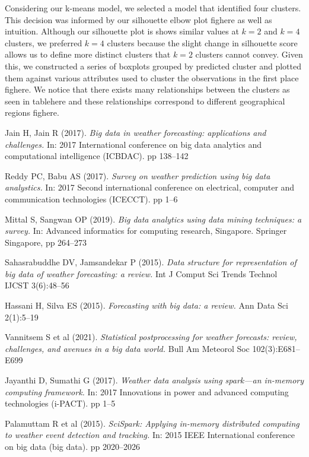 \documentclass[conference]{IEEEtran}
\begin{document}
Considering our k-means model, we selected a model that identified four clusters. This decision was informed by our silhouette elbow plot fighere as well as intuition. Although our silhouette plot is shows similar values at $k = 2$ and $k =4$ clusters, we preferred $k = 4$ clusters because the slight change in silhouette score allows us to define more distinct clusters that $k  = 2$ clusters cannot convey. Given this, we constructed a series of boxplots grouped by predicted cluster and plotted them against various attributes used to cluster the observations in the first place fighere. We notice that there exists many relationships between the clusters as seen in tablehere and these relationships correspond to different geographical regions fighere.

\begin{thebibliography}{9}

Jain H, Jain R (2017). \textit{Big data in weather forecasting: applications and challenges.} In: 2017 International conference on big data analytics and computational intelligence (ICBDAC). pp 138–142

Reddy PC, Babu AS (2017). \textit{Survey on weather prediction using big data analystics.} In: 2017 Second international conference on electrical, computer and communication technologies (ICECCT). pp 1–6

Mittal S, Sangwan OP (2019). \textit{Big data analytics using data mining techniques: a survey.} In: Advanced informatics for computing research, Singapore. Springer Singapore, pp 264–273

Sahasrabuddhe DV, Jamsandekar P (2015). \textit{Data structure for representation of big data of weather forecasting: a review.} Int J Comput Sci Trends Technol IJCST 3(6):48–56

Hassani H, Silva ES (2015). \textit{Forecasting with big data: a review.} Ann Data Sci 2(1):5–19

Vannitsem S et al (2021). \textit{Statistical postprocessing for weather forecasts: review, challenges, and avenues in a big data world.} Bull Am Meteorol Soc 102(3):E681–E699

Jayanthi D, Sumathi G (2017). \textit{Weather data analysis using spark—an in-memory computing framework.} In: 2017 Innovations in power and advanced computing technologies (i-PACT). pp 1–5

Palamuttam R et al (2015). \textit{SciSpark: Applying in-memory distributed computing to weather event detection and tracking.} In: 2015 IEEE International conference on big data (big data). pp 2020–2026

\end{thebibliography}
\end{document}
